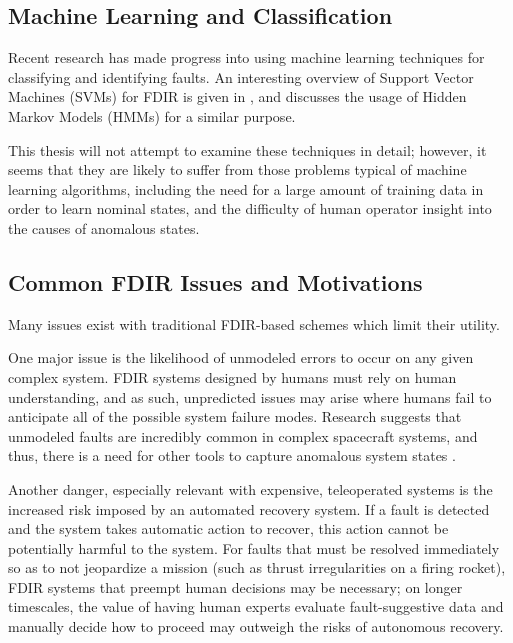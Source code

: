 \subsection{Machine Learning and Classification}

Recent research has made progress into using machine learning techniques for classifying and identifying faults. An interesting overview of Support Vector Machines (SVMs) for FDIR is given in \cite{lin2006fault}, and \cite{aycard2000state} discusses the usage of Hidden Markov Models (HMMs) for a similar purpose.

This thesis will not attempt to examine these techniques in detail; however, it seems that they are likely to suffer from those problems typical of machine learning algorithms, including the need for a large amount of training data in order to learn nominal states, and the difficulty of human operator insight into the causes of anomalous states.



\subsection{Common FDIR Issues and Motivations}

Many issues exist with traditional FDIR-based schemes which limit their utility.

One major issue is the likelihood of unmodeled errors to occur on any given complex system. FDIR systems designed by humans must rely on human understanding, and as such, unpredicted issues may arise where humans fail to anticipate all of the possible system failure modes. Research suggests that unmodeled faults are incredibly common in complex spacecraft systems, and thus, there is a need for other tools to capture anomalous system states \cite{kurien2010intrinsic}.

Another danger, especially relevant with expensive, teleoperated systems is the increased risk imposed by an automated recovery system. If a fault is detected and the system takes automatic action to recover, this action cannot be potentially harmful to the system. For faults that must be resolved immediately so as to not jeopardize a mission (such as thrust irregularities on a firing rocket), FDIR systems that preempt human decisions may be necessary; on longer timescales, the value of having human experts evaluate fault-suggestive data and manually decide how to proceed may outweigh the risks of autonomous recovery.

